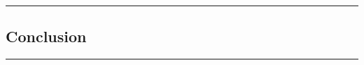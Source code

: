 {\color{gray}\hrule}
\begin{center}
	\section{Conclusion}
	\bigskip
\end{center}
{\color{gray}\hrule}
\vspace{0.5cm}